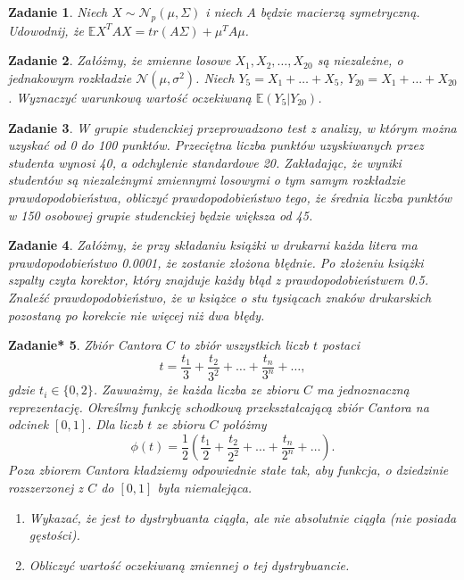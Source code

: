 \documentclass{mwart}
\newtheorem{zd}{Zadanie}
\newtheorem{zdt}[zd]{Zadanie*}
\begin{document}
\begin{zd}
Niech $X\sim \mathcal{N}_p\left(\mu, \Sigma \right)$ i niech $A$ będzie macierzą symetryczną. Udowodnij, że
$\mathbb{E}X^TAX = tr(A\Sigma) + \mu^T A \mu$.
\end{zd}

\begin{zd}
Załóżmy, że zmienne losowe $X_1, X_2, \dots, X_{20}$ są niezależne, o jednakowym
rozkładzie $\mathcal{N}(\mu, \sigma^2)$. Niech $Y_5 = X_1 + \dots + X_5$, $Y_{20} = X_1+\dots +X_{20}$. Wyznaczyć warunkową wartość oczekiwaną $\mathbb{E}(Y_5|Y_{20})$.
\end{zd}

\begin{zd}
W grupie studenckiej przeprowadzono test z analizy, w którym można uzyskać od 0 do 100 punktów. Przeciętna liczba punktów uzyskiwanych przez studenta wynosi 40, a odchylenie standardowe 20. Zakładając, że wyniki studentów są niezależnymi zmiennymi losowymi o tym samym rozkładzie prawdopodobieństwa, obliczyć prawdopodobieństwo tego, że średnia liczba punktów w 150 osobowej grupie studenckiej będzie większa od 45.
\end{zd}

\begin{zd}
Załóżmy, że przy składaniu książki w drukarni każda litera ma prawdopodobieństwo 0.0001, że zostanie złożona błędnie. Po złożeniu książki szpalty czyta korektor, który znajduje każdy błąd z prawdopodobieństwem 0.5. Znaleźć prawdopodobieństwo, że w książce o stu tysiącach znaków drukarskich pozostaną po korekcie nie więcej niż dwa błędy.
\end{zd}

\begin{zdt}
Zbiór Cantora $C$ to zbiór wszystkich liczb $t$ postaci
\begin{displaymath}
t = \frac{t_1}{3} + \frac{t_2}{3^2} + \dots + \frac{t_n}{3^n}+\dots,
\end{displaymath}
gdzie $t_i\in \{0, 2\}$. Zauważmy, że każda liczba ze zbioru $C$ ma jednoznaczną reprezentację. Określmy funkcję schodkową przekształcającą zbiór Cantora na odcinek $[0, 1]$. Dla liczb $t$ ze zbioru $C$ połóżmy
\begin{displaymath}
\phi(t) = \frac{1}{2}\left(\frac{t_1}{2} + \frac{t_2}{2^2} + \dots + \frac{t_n}{2^n}+\dots\right).
\end{displaymath}
Poza zbiorem Cantora kładziemy odpowiednie stałe tak, aby funkcja, o dziedzinie rozszerzonej z $C$ do $[0, 1]$
była niemalejąca.
\begin{enumerate}
\item Wykazać, że jest to dystrybuanta ciągła, ale nie absolutnie ciągła (nie posiada gęstości).
\item Obliczyć wartość oczekiwaną zmiennej o tej dystrybuancie.
\end{enumerate}
\end{zdt}
\end{document}
